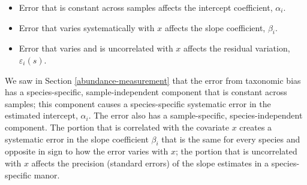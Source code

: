 \documentclass[
]{article}
\providecommand{\tightlist}{%
  \setlength{\itemsep}{0pt}\setlength{\parskip}{0pt}}
\begin{document}
\begin{itemize}
\tightlist
\item
  Error that is constant across samples affects the intercept coefficient, \(\alpha_i\).
\item
  Error that varies systematically with \(x\) affects the slope coefficient, \(\beta_i\).
\item
  Error that varies and is uncorrelated with \(x\) affects the residual variation, \(\varepsilon_{i}(s)\).
\end{itemize}

We saw in Section \ref{abundance-measurement} that the error from taxonomic bias has a species-specific, sample-independent component that is constant across samples; this component causes a species-specific systematic error in the estimated intercept, \(\alpha_{i}\).
The error also has a sample-specific, species-independent component.
The portion that is correlated with the covariate \(x\) creates a systematic error in the slope coefficient \(\beta_{i}\) that is the same for every species and opposite in sign to how the error varies with \(x\);
the portion that is uncorrelated with \(x\) affects the precision (standard errors) of the slope estimates in a species-specific manor.
\end{document}
